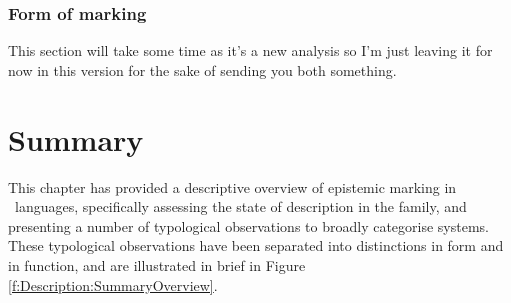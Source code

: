 \subsubsection{Form of marking}
This section will take some time as it's a new analysis so I'm just leaving it for now in this version for the sake of sending you both something.

\section{Summary}
This chapter has provided a descriptive overview of epistemic marking in \lfam\ languages, specifically assessing the state of description in the family, and presenting a number of typological observations to broadly categorise systems. These typological observations have been separated into distinctions in form and in function, and are illustrated in brief in Figure \ref{f:Description:SummaryOverview}.

